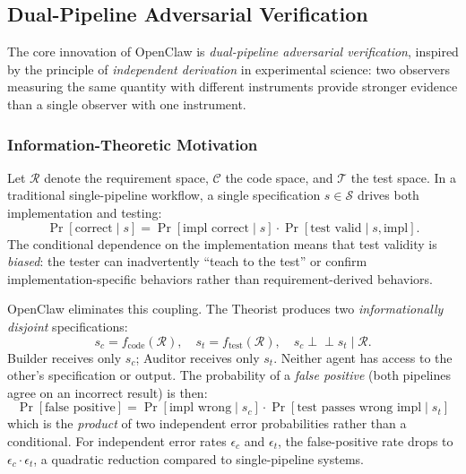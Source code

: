 \subsection{Dual-Pipeline Adversarial Verification}
\label{sec:dual-pipeline}

The core innovation of OpenClaw is \emph{dual-pipeline adversarial
verification}, inspired by the principle of \emph{independent
derivation} in experimental science: two observers measuring the
same quantity with different instruments provide stronger evidence
than a single observer with one instrument.

\subsubsection{Information-Theoretic Motivation}

Let $\mathcal{R}$ denote the requirement space, $\mathcal{C}$ the
code space, and $\mathcal{T}$ the test space. In a traditional
single-pipeline workflow, a single specification
$s \in \mathcal{S}$ drives both implementation and testing:
\begin{equation}
  \Pr[\text{correct} \mid s] =
    \Pr[\text{impl correct} \mid s] \cdot
    \Pr[\text{test valid} \mid s, \text{impl}].
  \label{eq:single-pipe}
\end{equation}
The conditional dependence on the implementation means that test
validity is \emph{biased}: the tester can inadvertently ``teach to
the test'' or confirm implementation-specific behaviors rather than
requirement-derived behaviors.

OpenClaw eliminates this coupling. The Theorist produces two
\emph{informationally disjoint} specifications:
\begin{equation}
  s_c = f_{\text{code}}(\mathcal{R}), \quad
  s_t = f_{\text{test}}(\mathcal{R}), \quad
  s_c \perp\!\!\!\perp s_t \mid \mathcal{R}.
  \label{eq:dual-spec}
\end{equation}
Builder receives only $s_c$; Auditor receives only $s_t$. Neither
agent has access to the other's specification or output. The
probability of a \emph{false positive} (both pipelines agree on an
incorrect result) is then:
\begin{equation}
  \Pr[\text{false positive}] =
    \Pr[\text{impl wrong} \mid s_c] \cdot
    \Pr[\text{test passes wrong impl} \mid s_t]
  \label{eq:false-positive}
\end{equation}
which is the \emph{product} of two independent error probabilities
rather than a conditional. For independent error rates $\epsilon_c$
and $\epsilon_t$, the false-positive rate drops to
$\epsilon_c \cdot \epsilon_t$, a quadratic reduction compared to
single-pipeline systems.

